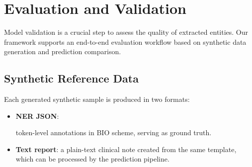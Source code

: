 \documentclass[conference]{IEEEtran}
\begin{document}
\section{Evaluation and Validation}
Model validation is a crucial step to assess the quality of extracted entities. 
Our framework supports an end-to-end evaluation workflow based on synthetic data generation and prediction comparison.

\subsection{Synthetic Reference Data}
Each generated synthetic sample is produced in two formats:
\begin{itemize}
    \item \textbf{NER JSON}: {\raggedright token-level annotations in BIO scheme, serving as ground truth.\par}
    \item \textbf{Text report}: a plain-text clinical note created from the same template, which can be processed by the prediction pipeline.
\end{itemize}
\end{document}
